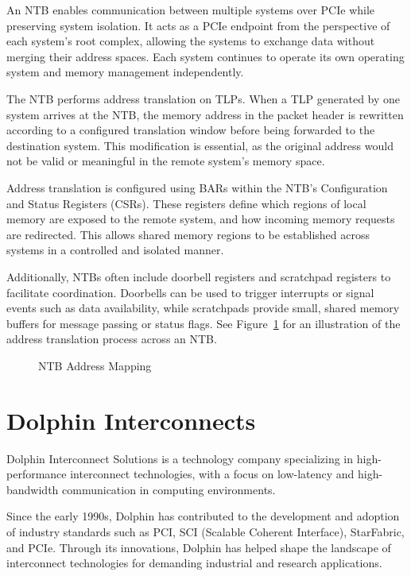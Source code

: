 An NTB enables communication between multiple systems over PCIe while preserving system isolation. It acts as a PCIe endpoint from the perspective of each system’s root complex, allowing the systems to exchange data without merging their address spaces. Each system continues to operate its own operating system and memory management independently.

The NTB performs address translation on TLPs. When a TLP generated by one system arrives at the NTB, the memory address in the packet header is rewritten according to a configured translation window before being forwarded to the destination system. This modification is essential, as the original address would not be valid or meaningful in the remote system’s memory space.

Address translation is configured using BARs within the NTB’s Configuration and Status Registers (CSRs). These registers define which regions of local memory are exposed to the remote system, and how incoming memory requests are redirected. This allows shared memory regions to be established across systems in a controlled and isolated manner.

Additionally, NTBs often include doorbell registers and scratchpad registers to facilitate coordination. Doorbells can be used to trigger interrupts or signal events such as data availability, while scratchpads provide small, shared memory buffers for message passing or status flags.
See Figure~\ref{fig:adress_translation} for an illustration of the address translation process across an NTB. \cite{PLX_NTB_PCIe}

\begin{figure}[H]
    \centering
    
    \caption[NTB Address Translation]{NTB Address Mapping}

    \label{fig:adress_translation}
\end{figure}

\section{Dolphin Interconnects}

Dolphin Interconnect Solutions is a technology company specializing in high-performance interconnect technologies, with a focus on low-latency and high-bandwidth communication in computing environments.

Since the early 1990s, Dolphin has contributed to the development and adoption of industry standards such as PCI, SCI (Scalable Coherent Interface), StarFabric, and PCIe. Through its innovations, Dolphin has helped shape the landscape of interconnect technologies for demanding industrial and research applications.

